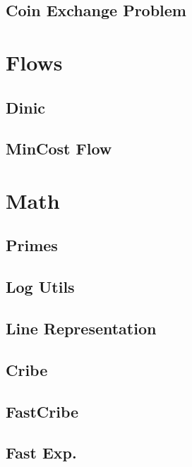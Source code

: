 \subsection{   Coin Exchange Problem}
\raggedbottom
\hrulefill

\section{Flows}
\subsection{  Dinic}
\raggedbottom
\hrulefill
\subsection{ MinCost Flow}
\raggedbottom
\hrulefill

\section{Math}
\subsection{ Primes}
\raggedbottom
\hrulefill
\subsection{Log Utils}
\raggedbottom
\hrulefill
\subsection{   Line Representation}
\raggedbottom
\hrulefill
\subsection{Cribe}
\raggedbottom
\hrulefill
\subsection{FastCribe}
\raggedbottom
\hrulefill
\subsection{ Fast Exp.}
\raggedbottom
\hrulefill
